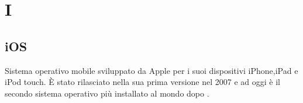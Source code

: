 \section*{I}
\markright{}
\subsection*{iOS}
Sistema operativo mobile sviluppato da Apple per i suoi dispositivi iPhone,iPad e iPod touch. È stato rilasciato nella sua prima versione nel 2007 e ad oggi è il secondo sistema operativo più installato al mondo dopo .